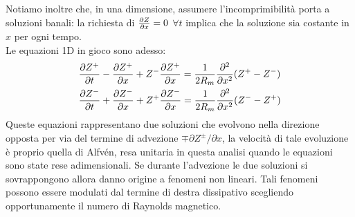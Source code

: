 Notiamo inoltre che, in una dimensione,  assumere l'incomprimibilità porta a soluzioni banali: la richiesta di $\frac{\partial Z}{\partial x} = 0$ $\forall t$ implica che la soluzione sia costante in $x$ per ogni tempo.\\
Le equazioni 1D in gioco sono adesso:
\begin{align}
    &\frac{\partial Z^+}{\partial t} - \frac{\partial Z^+}{\partial x} + Z^- \frac{\partial Z^+}{\partial x} = \frac{1}{2R_m} \frac{\partial^2}{\partial x^2}(Z^+ - Z^-) \\
    &\frac{\partial Z^-}{\partial t} + \frac{\partial Z^-}{\partial x} + Z^+ \frac{\partial Z^-}{\partial x} = \frac{1}{2R_m} \frac{\partial^2}{\partial x^2}(Z^- - Z^+) 
\end{align}
Queste equazioni rappresentano due soluzioni che evolvono nella direzione opposta per via del termine di advezione $\mp \partial Z^{\pm}/\partial x$, la velocità di tale evoluzione è proprio quella di Alfvén, resa unitaria in questa analisi quando le equazioni sono state rese adimensionali.
Se durante l'advezione le due soluzioni si sovrappongono allora danno origine a fenomeni non lineari. Tali fenomeni possono essere modulati dal termine di destra dissipativo scegliendo opportunamente il numero di Raynolds magnetico.


